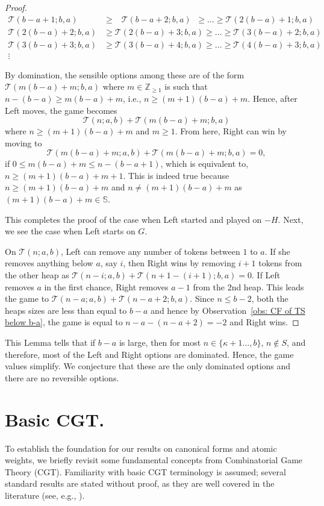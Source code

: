 \documentclass[oneside,reqno]{amsart}
\newcommand{\ts}{\mathcal{T}}
\begin{document}
\begin{proof}
    \begin{align}
        \ts(b-a+1;b,a)&\ge \;\;\:\ts(b-a+2;b,a)\;\;\ge\dots\ge \ts(2(b-a)+1;b,a)\\
        \ts(2(b-a)+2;b,a)&\ge \ts(2(b-a)+3;b,a)\ge\dots\ge \ts(3(b-a)+2;b,a)\\
        \ts(3(b-a)+3;b,a)&\ge \ts(3(b-a)+4;b,a)\ge\dots\ge \ts(4(b-a)+3;b,a)\\
        \vdots\nonumber
    \end{align}

    By domination, the sensible options among these are of the form $\ts(m(b-a)+m;b,a)$ where $m\in \mathbb Z_{\ge 1}$ is such that $n-(b-a)\ge m(b-a)+m$, i.e., $n\ge (m+1)(b-a)+m$. Hence, after Left moves, the game becomes $$\ts(n;a,b)+\ts(m(b-a)+m;b,a)$$ where $n\ge (m+1)(b-a)+m$ and $m\ge 1$. From here, Right can win by moving to $$\ts(m(b-a)+m;a,b)+\ts(m(b-a)+m;b,a)=0,$$ if $0\le m(b-a)+m\le n-(b-a+1)$, which is equivalent to, $n\ge (m+1)(b-a)+m+1$. This is indeed true because $n\ge (m+1)(b-a)+m$ and $n\ne (m+1)(b-a)+m$ as $(m+1)(b-a)+m\in\mathbb S$.

    This completes the proof of the case when Left started and played on $-H$. Next, we see the case when Left starts on $G$.

    On $\ts(n;a,b)$, Left can remove any number of tokens between $1$ to $a$. If she removes anything below $a$, say $i$, then Right wins by removing $i+1$ tokens from the other heap as $\ts(n-i;a,b)+\ts(n+1-(i+1);b,a)=0$. If Left removes $a$ in the first chance, Right removes $a-1$ from the 2nd heap. This leads the game to $\ts(n-a;a,b)+\ts(n-a+2;b,a)$. Since $n\le b-2$, both the heaps sizes are less than equal to $b-a$ and hence by Observation~\ref{obs: CF of TS below b-a}, the game is equal to $n-a-(n-a+2)=-2$ and Right wins. 
\end{proof}

This Lemma tells that if $b-a$ is large, then for most $n\in \{\kappa+1\dots,b\}$, $n\notin S$, and therefore, most of the Left and Right options are dominated. Hence, the game values simplify. We conjecture that these are the only dominated options and there are no reversible options. 
\fi

\appendix
\section{Basic CGT.}\label{sec: prelims}
    To establish the foundation for our results on canonical forms and atomic weights, we briefly revisit some fundamental concepts from Combinatorial Game Theory (CGT). 
    Familiarity with basic CGT terminology is assumed; several standard results are stated without proof, as they are well covered in the literature (see, e.g., \cites{BCG2004, S2013}).
\end{document}
